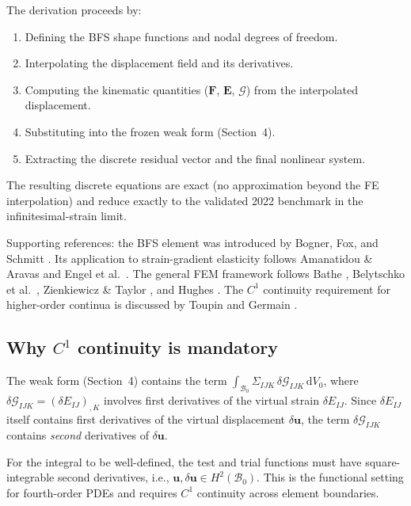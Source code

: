 \documentclass[11pt]{article}
\newcommand{\bu}{\mathbf{u}}
\newcommand{\bF}{\mathbf{F}}
\newcommand{\bE}{\mathbf{E}}
\newcommand{\bu}{\mathbf{u}}
\newcommand{\bF}{\mathbf{F}}
\newcommand{\bE}{\mathbf{E}}
\begin{document}
The derivation proceeds by:
\begin{enumerate}
\item Defining the BFS shape functions and nodal degrees of freedom.
\item Interpolating the displacement field and its derivatives.
\item Computing the kinematic quantities ($\bF$, $\bE$, $\bm{\mathcal{G}}$)
  from the interpolated displacement.
\item Substituting into the frozen weak form (Section~4).
\item Extracting the discrete residual vector and the final nonlinear
  system.
\end{enumerate}

The resulting discrete equations are exact (no approximation beyond the
FE interpolation) and reduce exactly to the validated 2022 benchmark in
the infinitesimal-strain limit.

Supporting references: the BFS element was introduced by
Bogner, Fox, and Schmitt \cite{BognerFoxSchmitt1965}. Its application
to strain-gradient elasticity follows Amanatidou \& Aravas
\cite{AmanatidouAravas2002} and Engel et al.\
\cite{EngelGarikipati2002}. The general FEM framework follows
Bathe \cite{Bathe2006}, Belytschko et al.\ \cite{Belytschko2000},
Zienkiewicz \& Taylor \cite{ZienkiewiczTaylor2000}, and Hughes
\cite{Hughes1987}. The $C^{1}$ continuity requirement for higher-order
continua is discussed by Toupin \cite{Toupin1964} and Germain
\cite{Germain1973}.

\subsection{Why $C^{1}$ continuity is mandatory}
\label{ssec:c1_requirement}

The weak form (Section~4) contains the term
$\int_{\mathcal{B}_{0}}\Sigma_{IJK}\,\delta\mathcal{G}_{IJK}\,\mathrm{d}V_{0}$,
where $\delta\mathcal{G}_{IJK}=(\delta E_{IJ})_{,K}$ involves first
derivatives of the virtual strain $\delta E_{IJ}$. Since
$\delta E_{IJ}$ itself contains first derivatives of the virtual
displacement $\delta\bu$, the term $\delta\mathcal{G}_{IJK}$ contains
\emph{second} derivatives of $\delta\bu$.

For the integral to be well-defined, the test and trial functions must
have square-integrable second derivatives, i.e.,
$\bu,\delta\bu\in H^{2}(\mathcal{B}_{0})$. This is the functional
setting for fourth-order PDEs and requires $C^{1}$ continuity across
element boundaries.
\end{document}
